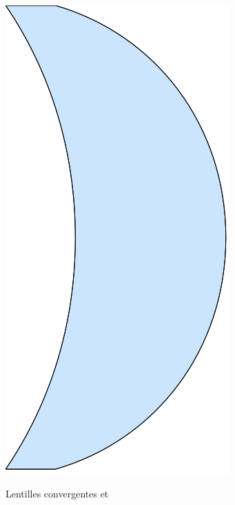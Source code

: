 \begin{minipage}[m]{.48\linewidth}
\begin{figure}[H]
{			\includegraphics{images/lentille2}
		}
		\caption{Lentilles convergentes
			 et }
		\label{fig:lentillesTypes}
	\end{figure}
\end{minipage}


